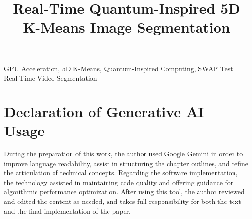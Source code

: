 \documentclass[conference]{IEEEtran}
\begin{document}
\title{Real-Time Quantum-Inspired 5D K-Means Image Segmentation}

\author{
}

\maketitle

\begin{abstract}

\end{abstract}

\begin{IEEEkeywords}
GPU Acceleration, 5D K-Means, Quantum-Inspired Computing, SWAP Test, Real-Time Video Segmentation
\end{IEEEkeywords}








\section*{Declaration of Generative AI Usage}
During the preparation of this work, the author used Google Gemini in order to improve language readability, assist in structuring the chapter outlines, and refine the articulation of technical concepts. Regarding the software implementation, the technology assisted in maintaining code quality and offering guidance for algorithmic performance optimization. After using this tool, the author reviewed and edited the content as needed, and takes full responsibility for both the text and the final implementation of the paper.



\end{document}
